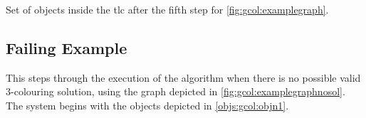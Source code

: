 \begin{cpobjectsfloat}
\begin{cpobjects}

    
    
    
            \cpobjectsline{\vdots}
            
    
\end{cpobjects}
\caption{\label{objs:gcol:obj6}Set of objects inside the \gls{tlc} after the fifth step for \cref{fig:gcol:examplegraph}.}
\end{cpobjectsfloat}


\subsection{\label{sec:gcol:examplefail}Failing Example}
This  steps through the execution of the algorithm when there is no possible valid 3-colouring solution, using the graph depicted in \cref{fig:gcol:examplegraphnosol}.  The system begins with the objects depicted in \cref{objs:gcol:objn1}.

